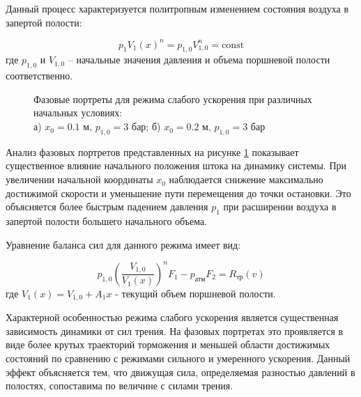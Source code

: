 Данный процесс
характеризуется политропным изменением состояния воздуха в запертой полости:

\begin{equation}
	p_1V_1(x)^n = p_{1,0}V_{1,0}^n = \text{const}
\end{equation}
где $p_{1,0}$ и $V_{1,0}$ -- начальные значения давления и объема поршневой полости соответственно.

\begin{figure}[htbp]
	\caption{Фазовые портреты для режима слабого ускорения при различных начальных условиях:\\
		а) $x_0 = \num{0.1}$ м, $p_{1,0} = 3$ бар; б) $x_0 = \num{0.2}$ м, $p_{1,0} = 3$ бар}
	\label{fig:pp_weak_acceleration}
\end{figure}

Анализ фазовых портретов представленных на рисунке \ref{fig:pp_weak_acceleration} показывает существенное влияние начального
положения штока на динамику системы. При увеличении начальной координаты $x_0$ наблюдается снижение максимально достижимой
скорости и уменьшение пути перемещения до точки остановки. Это объясняется более быстрым падением давления $p_1$ при расширении
воздуха в запертой полости большего начального объема.

Уравнение баланса сил для данного режима имеет вид:

\begin{equation}
	p_{1,0}\left(\frac{V_{1,0}}{V_1(x)}\right)^nF_1 - p_\text{атм}F_2 = R_\text{тр}(v)
\end{equation}
где $V_1(x) = V_{1,0} + A_1x$ - текущий объем поршневой полости.

Характерной особенностью режима слабого ускорения является существенная зависимость динамики
от сил трения. На фазовых портретах это проявляется в виде более крутых траекторий
торможения и меньшей области достижимых состояний по сравнению с режимами сильного и
умеренного ускорения. Данный эффект объясняется тем, что движущая сила, определяемая
разностью давлений в полостях, сопоставима по величине с силами трения.


